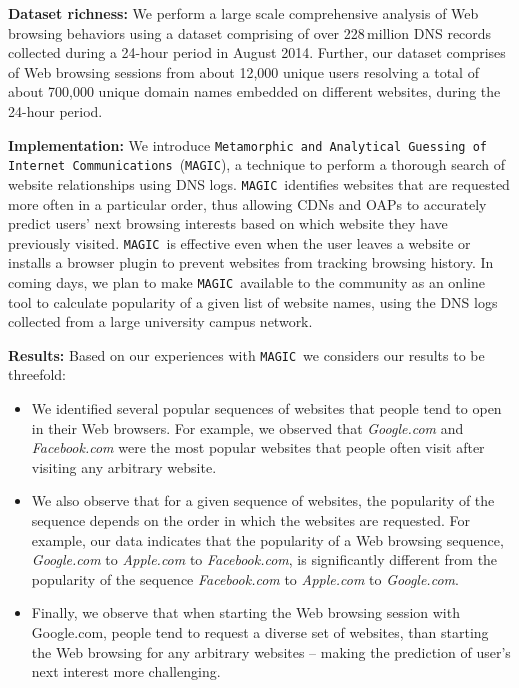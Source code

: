 \documentclass[letterpaper,twocolumn]{article}
\newcommand{\soll}{\texttt{Metamorphic and Analytical Guessing of Internet Communications}}
\newcommand{\sol}{\texttt{MAGIC}}
\begin{document}
\noindent
\textbf{Dataset richness:}  We perform a large scale comprehensive analysis of Web browsing behaviors using a dataset comprising of over 228\,million DNS records collected during a 24-hour period in August 2014.
Further, our dataset comprises of Web browsing sessions from about 12,000 unique users resolving a total of about 700,000 unique domain names embedded on different websites, during the 24-hour period.

\noindent
\textbf{Implementation:} We introduce \soll~(\sol), a technique to perform a thorough search of website relationships using DNS logs.
\sol~identifies websites that are requested more often in a particular order, thus allowing CDNs and OAPs to accurately predict users' next browsing interests based on which website they have previously visited.
\sol~is effective even when the user leaves a website or installs a browser plugin to prevent websites from tracking browsing history.
In coming days, we plan to make \sol~available to the community as an online tool to calculate popularity of a given list of website names, using the DNS logs collected from a large university campus network.

\noindent
\textbf{Results:} Based on our experiences with \sol\, we considers our results to be threefold:

\vspace{-9pt}
\begin{itemize}
    \item We identified several popular sequences of websites that people tend to open in their Web browsers.
    For example, we observed that \textit{Google.com} and \textit{Facebook.com} were the most popular websites that people often visit after visiting any arbitrary website.
\vspace{-6pt}
    \item We also observe that for a given sequence of websites, the popularity of the sequence depends on the order in which the websites are requested.
    For example, our data indicates that the popularity of a Web browsing sequence, \textit{Google.com} to \textit{Apple.com} to \textit{Facebook.com}, is significantly different from the popularity of the sequence \textit{Facebook.com} to \textit{Apple.com} to \textit{Google.com}.
\vspace{-6pt}
    \item Finally, we observe that when starting the Web browsing session with Google.com, people tend to request a diverse set of websites, than starting the Web browsing for any arbitrary websites -- making the prediction of user's next interest more challenging.
\end{itemize}
\end{document}
